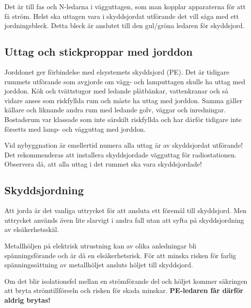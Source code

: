 Det är till fas och N-ledarna i vägguttagen, som man kopplar apparaterna för
att få ström.
Helst ska uttagen vara i skyddsjordat utförande det vill säga med ett
jordningsbleck.
Detta bleck är anslutet till den gul/gröna ledaren för skyddsjord.

\subsection{Uttag och stickproppar med jorddon}

Jorddonet ger förbindelse med elsystemets skyddsjord (PE).
Det är tidigare rummets utförande som avgjorde om vägg- och lamputtagen skulle
ha uttag med jorddon.
Kök och tvättstugor med ledande plåtbänkar, vattenkranar och så vidare anses
som riskfyllda rum och måste ha uttag med jorddon.
Samma gäller källare och liknande andra rum med ledande golv, väggar och
inredningar.
Bostadsrum var klassade som inte särskilt riskfyllda och har därför tidigare
inte försetts med lamp- och vägguttag med jorddon.

Vid nybyggnation är emellertid numera alla uttag är av skyddsjordat utförande!
Det rekommenderas att installera skyddsjordade vägguttag för radiostationen.
Observera då, att alla uttag i det rummet ska vara skyddsjordade!

\subsection{Skyddsjordning}

Att jorda är det vanliga uttrycket för att ansluta ett föremål till skyddsjord.
Men uttrycket används även lite slarvigt i andra fall utan att syfta på
skyddsjordning av elsäkerhetsskäl.

Metallhöljen på elektrisk utrustning kan av olika anledningar bli
spänningsförande och är då en elsäkerhetsrisk.
För att minska risken för farlig spänningssättning av metallhöljet ansluts
höljet till skyddsjord.

\begin{center}
\begin{minipage}{0.19\columnwidth}
\Huge{\selectfont{}\relax}
\end{minipage}
\begin{minipage}{0.7\columnwidth}
Om det blir isolationsfel mellan en strömförande del och höljet kommer
säkringen att bryta strömtillförseln och risken för skada minskar.
\textbf{PE-ledaren får därför aldrig brytas!}
\end{minipage}
\end{center}


